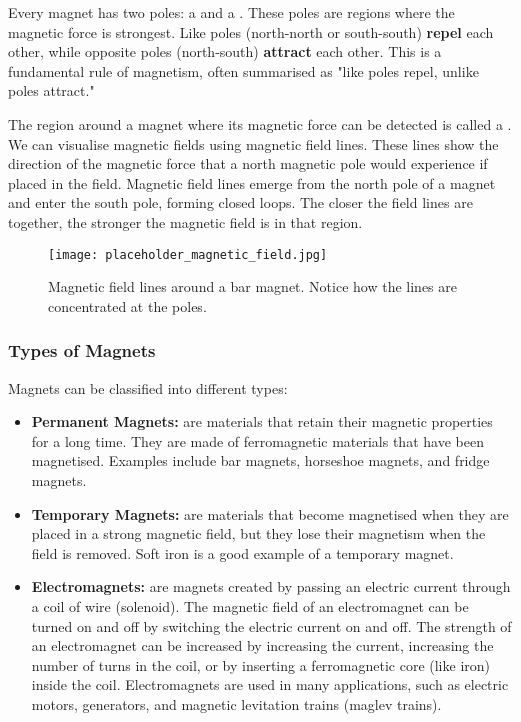 Every magnet has two poles: a  and a .  These poles are regions where the magnetic force is strongest.  Like poles (north-north or south-south) \textbf{repel} each other, while opposite poles (north-south) \textbf{attract} each other.  This is a fundamental rule of magnetism, often summarised as "like poles repel, unlike poles attract."

The region around a magnet where its magnetic force can be detected is called a .  We can visualise magnetic fields using magnetic field lines.  These lines show the direction of the magnetic force that a north magnetic pole would experience if placed in the field.  Magnetic field lines emerge from the north pole of a magnet and enter the south pole, forming closed loops.  The closer the field lines are together, the stronger the magnetic field is in that region.

\begin{figure}
\centering
\texttt{[image: placeholder\_magnetic\_field.jpg]}
\caption*{Magnetic field lines around a bar magnet.  Notice how the lines are concentrated at the poles.}
\end{figure}

\subsubsection{Types of Magnets}

Magnets can be classified into different types:

\begin{itemize}
    \item \textbf{Permanent Magnets:}   are materials that retain their magnetic properties for a long time.  They are made of ferromagnetic materials that have been magnetised.  Examples include bar magnets, horseshoe magnets, and fridge magnets.

    \item \textbf{Temporary Magnets:}  are materials that become magnetised when they are placed in a strong magnetic field, but they lose their magnetism when the field is removed.  Soft iron is a good example of a temporary magnet.

    \item \textbf{Electromagnets:}   are magnets created by passing an electric current through a coil of wire (solenoid).  The magnetic field of an electromagnet can be turned on and off by switching the electric current on and off.  The strength of an electromagnet can be increased by increasing the current, increasing the number of turns in the coil, or by inserting a ferromagnetic core (like iron) inside the coil.  Electromagnets are used in many applications, such as electric motors, generators, and magnetic levitation trains (maglev trains).
\end{itemize}

